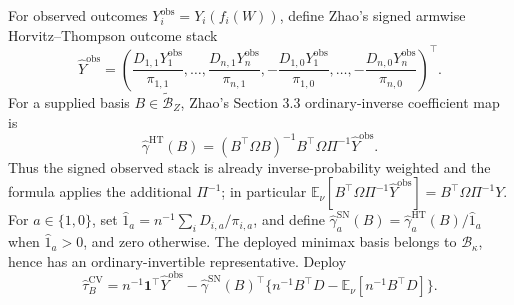 For observed outcomes \(Y_i^{\mathrm{obs}}=Y_i(f_i(W))\), define Zhao's signed armwise Horvitz--Thompson outcome stack
\[
\widehat Y^{\mathrm{obs}}=
\left(\frac{D_{1,1}Y_1^{\mathrm{obs}}}{\pi_{1,1}},\ldots,
\frac{D_{n,1}Y_n^{\mathrm{obs}}}{\pi_{n,1}},
-\frac{D_{1,0}Y_1^{\mathrm{obs}}}{\pi_{1,0}},\ldots,
-\frac{D_{n,0}Y_n^{\mathrm{obs}}}{\pi_{n,0}}\right)^{\top}.
\]
For a supplied basis \(B\in\widetilde{\mathcal B}_Z\), Zhao's Section 3.3 ordinary-inverse coefficient map is
\[
\widehat\gamma^{\mathrm{HT}}(B)
=(B^{\top}\Omega B)^{-1}B^{\top}\Omega\Pi^{-1}\widehat Y^{\mathrm{obs}}.
\]
Thus the signed observed stack is already inverse-probability weighted and the formula applies the additional \(\Pi^{-1}\); in particular
\(\mathbb E_\nu[B^{\top}\Omega\Pi^{-1}\widehat Y^{\mathrm{obs}}]
=B^{\top}\Omega\Pi^{-1}Y\).
For \(a\in\{1,0\}\), set \(\widehat1_a=n^{-1}\sum_iD_{i,a}/\pi_{i,a}\), and define \(\widehat\gamma_a^{\mathrm{SN}}(B)=\widehat\gamma_a^{\mathrm{HT}}(B)/\widehat1_a\) when \(\widehat1_a>0\), and zero otherwise.  The deployed minimax basis belongs to \(\mathcal B_\kappa\), hence has an ordinary-invertible representative.  Deploy
\[
\widehat\tau_B^{\mathrm{CV}}
=n^{-1}\mathbf1^{\top}\widehat Y^{\mathrm{obs}}
-\widehat\gamma^{\mathrm{SN}}(B)^{\top}
\{n^{-1}B^{\top}D-\mathbb E_\nu[n^{-1}B^{\top}D]\}.
\]